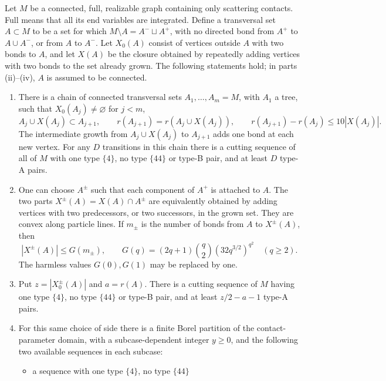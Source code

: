 \begin{proposition}\label{prop:cutoff-import}
Let \(M\) be a connected, full, realizable graph containing only
scattering contacts.  Full means that all its end variables are
integrated.  Define a transversal set \(A\subset M\) to be a set for
which \(M\setminus A=A^-\sqcup A^+\), with no directed bond from
\(A^+\) to \(A\cup A^-\), or from \(A\) to \(A^-\).
Let \(X_0(A)\) consist of vertices outside \(A\) with two bonds to
\(A\), and let \(X(A)\) be the closure obtained by repeatedly adding
vertices with two bonds to the set already grown.  The following
statements hold; in parts \textup{(ii)--(iv)}, \(A\) is assumed to be
connected.
\begin{enumerate}[label=\textup{(\roman*)}]
\item\label{item:cutoff-growth}
There is a chain of connected transversal sets
\(A_1,\ldots,A_m=M\), with \(A_1\) a tree, such that
\(X_0(A_j)\neq\varnothing\) for \(j<m\),
\[
 A_j\cup X(A_j)\subset A_{j+1},\qquad
 r(A_{j+1})=r(A_j\cup X(A_j)),\qquad
 r(A_{j+1})-r(A_j)\leq10|X(A_j)|.
\]
The intermediate growth from \(A_j\cup X(A_j)\) to \(A_{j+1}\)
adds one bond at each new vertex.
For any \(D\) transitions in this chain there is a cutting sequence
of all of \(M\) with one type \(\{4\}\), no type \(\{44\}\) or
type-B pair, and at least \(D\) type-A pairs.
\item\label{item:cutoff-bfk}
One can choose \(A^\pm\) such that each component of \(A^+\) is
attached to \(A\).  The two parts
\(X^\pm(A)=X(A)\cap A^\pm\) are equivalently obtained by adding
vertices with two predecessors, or two successors, in the grown set.
They are convex along particle lines.  If \(m_\pm\) is the number
of bonds from \(A\) to \(X^\pm(A)\), then
\[
 |X^\pm(A)|\leq G(m_\pm),
 \qquad
 G(q)=(2q+1)\binom q2(32q^{3/2})^{q^2}\quad(q\geq2).
\]
The harmless values \(G(0),G(1)\) may be replaced by one.
\item\label{item:cutoff-trans}
Put \(z=|X_0^\pm(A)|\) and \(a=r(A)\).  There is a cutting
sequence of \(M\) having one type \(\{4\}\), no type \(\{44\}\)
or type-B pair, and at least \(z/2-a-1\) type-A pairs.
\item\label{item:cutoff-main}
For this same choice of side there is a finite Borel partition
of the contact-parameter domain, with a subcase-dependent integer
\(y\geq0\), and the following two available sequences in each
subcase:
\begin{itemize}
\item a sequence with one type \(\{4\}\), no type \(\{44\}\)

\end{itemize}
\end{enumerate}
\end{proposition}
